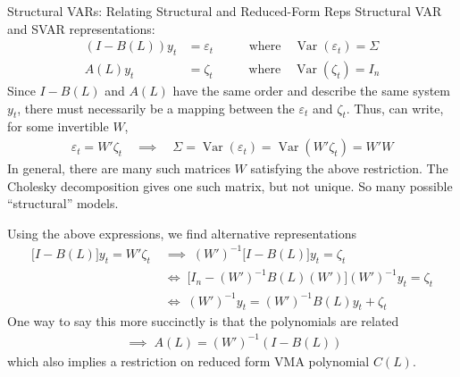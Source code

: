 \documentclass[aspectratio=169, handout]{beamer}
\newcommand{\Var}{\operatorname{Var}}
\begin{document}
{\scriptsize
\begin{frame}{Structural VARs: Relating Structural and Reduced-Form Reps}
Structural VAR and SVAR representations:
\begin{align*}
  (I-B(L))y_t
  &= \varepsilon_t
  \;\;\;\qquad\text{where}\quad
  \Var(\varepsilon_t)=\Sigma
  \\
  A(L)y_t &= \zeta_t
  \;\;\;\qquad\text{where}\quad
  \Var(\zeta_t)=I_n
\end{align*}
\pause
Since $I-B(L)$ and $A(L)$ have the same order and describe the same
system $y_t$, there must necessarily be a mapping between the
$\varepsilon_t$ and $\zeta_t$.
Thus, can write, for some invertible $W$,
\begin{align*}
  \varepsilon_t
  =
  W'\zeta_t
  \quad\implies\quad
  \Sigma = \Var(\varepsilon_t) = \Var(W'\zeta_t) = W'W
\end{align*}
In general, there are many such matrices $W$ satisfying the above
restriction.
The Cholesky decomposition gives one such matrix, but not unique.
So many possible ``structural'' models.

\pause
Using the above expressions, we find alternative representations
\begin{align*}
  \big[I-B(L)\big]y_t = W'\zeta_t
  \;&\implies\;
  (W')^{-1}\big[I-B(L)\big]y_t = \zeta_t
  \\
  \;&\iff\;
  \big[I_n-(W')^{-1}B(L)(W')\big](W')^{-1}y_t = \zeta_t
  \\
  \;&\iff\;
  (W')^{-1}y_t = (W')^{-1}B(L)y_t + \zeta_t
\end{align*}
One way to say this more succinctly is that the polynomials are related
\begin{align*}
  \;\implies\;
  A(L) = (W')^{-1}(I-B(L))
\end{align*}
which also implies a restriction on reduced form VMA polynomial $C(L)$.
\end{frame}
}
\end{document}
